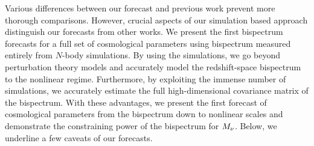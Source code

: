 Various differences between our forecast and previous work prevent more 
thorough comparisons. However, crucial aspects of our simulation based 
approach distinguish our forecasts from other works. %
We present the first bispectrum forecasts for a full set of cosmological 
parameters using bispectrum measured entirely from $N$-body simulations.
By using the simulations, we go beyond perturbation theory models and 
accurately model the redshift-space bispectrum to the nonlinear regime. 
Furthermore, by exploiting the immense number of simulations, we 
accurately estimate the full high-dimensional covariance matrix of 
the bispectrum. With these advantages, we present the first forecast
of cosmological parameters from the bispectrum down to nonlinear scales
and demonstrate the constraining power of the bispectrum for $M_\nu$. 
Below, we underline a few caveats of our forecasts.

